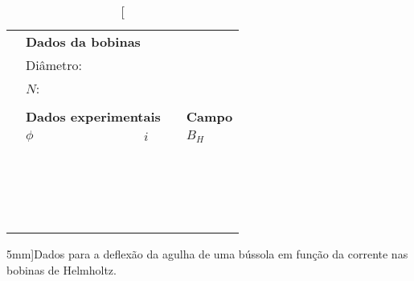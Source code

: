 \begin{table*}[!h]
\centering
\begin{tabular}{lp{25mm}p{25mm}cp{25mm}l}
\toprule
	& \multicolumn{2}{l}{\textbf{Dados da bobinas}} \\
	\cmidrule{2-3}
	& Diâmetro: \cellcolor[gray]{0.89} & \cellcolor[gray]{0.92} \\
	& $N$: \cellcolor[gray]{0.95} & \cellcolor[gray]{0.97} \\
	\cmidrule{2-3}
\\
	& \multicolumn{2}{l}{\textbf{Dados experimentais}} & & \multicolumn{2}{l}{\textbf{Campo}}\\
	\cmidrule{2-3}\cmidrule{5-5}
	& $\phi$ & $i$ && $B_H$ & \\
	\cmidrule{2-3}\cmidrule{5-5}
	& \cellcolor[gray]{0.89} & \cellcolor[gray]{0.92} & &\cellcolor[gray]{0.89} & \\
	& \cellcolor[gray]{0.95} & \cellcolor[gray]{0.97} & &\cellcolor[gray]{0.95} & \\
	& \cellcolor[gray]{0.89} & \cellcolor[gray]{0.92} & &\cellcolor[gray]{0.89} & \\
	& \cellcolor[gray]{0.95} & \cellcolor[gray]{0.97} & &\cellcolor[gray]{0.95} & \\
	& \cellcolor[gray]{0.89} & \cellcolor[gray]{0.92} & &\cellcolor[gray]{0.89} & \\
	& \cellcolor[gray]{0.95} & \cellcolor[gray]{0.97} & &\cellcolor[gray]{0.95} & \\
	& \cellcolor[gray]{0.89} & \cellcolor[gray]{0.92} & &\cellcolor[gray]{0.89} & \\
	& \cellcolor[gray]{0.95} & \cellcolor[gray]{0.97} & &\cellcolor[gray]{0.95} & \\
	& \cellcolor[gray]{0.89} & \cellcolor[gray]{0.92} & &\cellcolor[gray]{0.89} & \\
	& \cellcolor[gray]{0.95} & \cellcolor[gray]{0.97} & &\cellcolor[gray]{0.95} & \\
	& \cellcolor[gray]{0.89} & \cellcolor[gray]{0.92} & &\cellcolor[gray]{0.89} & \\
	& \cellcolor[gray]{0.95} & \cellcolor[gray]{0.97} & &\cellcolor[gray]{0.95} & \\
	& \cellcolor[gray]{0.89} & \cellcolor[gray]{0.92} & &\cellcolor[gray]{0.89} & \\
	& \cellcolor[gray]{0.95} & \cellcolor[gray]{0.97} & &\cellcolor[gray]{0.95} & \\
	& \cellcolor[gray]{0.89} & \cellcolor[gray]{0.92} & &\cellcolor[gray]{0.89} & \\
	& \cellcolor[gray]{0.95} & \cellcolor[gray]{0.97} & &\cellcolor[gray]{0.95} & \\
	& \cellcolor[gray]{0.89} & \cellcolor[gray]{0.92} & &\cellcolor[gray]{0.89} & \\
	& \cellcolor[gray]{0.95} & \cellcolor[gray]{0.97} & &\cellcolor[gray]{0.95} & \\
	\cmidrule{2-6}
\bottomrule
\end{tabular}
\caption[][5mm]{Dados para a deflexão da agulha de uma bússola em função da corrente nas bobinas de Helmholtz.}
\label{Tab:DadosCampoMagneticoTerrestre}
\end{table*}

